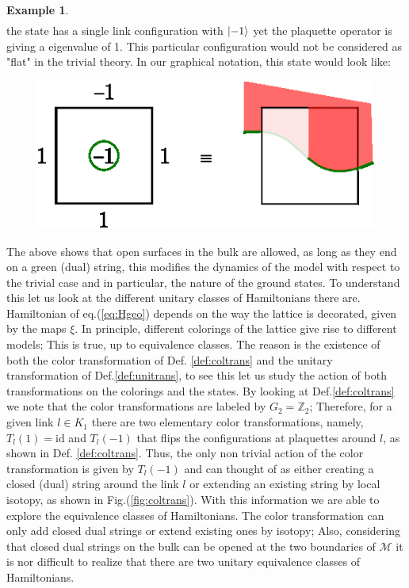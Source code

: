 \documentclass[a4paper,11pt]{article}
\theoremstyle{plain}%
\theoremstyle{definition}
\newtheorem{exmp}[thm]{Example}
\theoremstyle{remark}
\begin{document}
\begin{exmp}
\begin{align*}
\end{align*}
the state has a single link configuration with $\ket{-1}$ yet the plaquette operator is giving a eigenvalue of 1. This particular configuration would not be considered as "flat" in the trivial theory. In our graphical notation, this state would look like:
\begin{figure}[h!]
\centering
\includegraphics[scale=0.8]{graph2.eps}
\end{figure}
\end{exmp}
The above shows that open surfaces in the bulk are allowed, as long as they end on a green (dual) string, this modifies the dynamics of the model with respect to the trivial case and in particular, the nature of the ground states. To understand this let us look at the different unitary classes of Hamiltonians there are. Hamiltonian of eq.(\ref{eq:Hgeo}) depends on the way the lattice is decorated, given by the maps $\xi$. In principle, different colorings of the lattice give rise to different models; This is true, up to equivalence classes. 
The reason is the existence of both the color transformation of Def. \ref{def:coltrans} and the unitary transformation of Def.\ref{def:unitrans}, to see this let us study the action of both transformations on the colorings and the states. By looking at Def.\ref{def:coltrans} we note that the color transformations are labeled by \(G_2= \mathbb{Z}_2\); Therefore, for a given link \(l \in K_1\) there are two elementary color transformations, namely, \(T_l(1)= \text{id}\) and \(T_l(-1)\) that flips the configurations at plaquettes around \(l\), as shown in Def. \ref{def:coltrans}. Thus, the only non trivial action of the color transformation is given by \(T_l(-1)\) and can thought of as either creating a closed (dual) string around the link \(l\) or extending an existing string by local isotopy, as shown in Fig.(\ref{fig:coltrans}).
With this information we are able to explore the equivalence classes of Hamiltonians. The color transformation can only add closed dual strings or extend existing ones by isotopy; Also, considering that closed dual strings on the bulk can be opened at the two boundaries of \(\mathcal{M}\) it is nor difficult to realize that there are two unitary equivalence classes of Hamiltonians.
\end{document}
